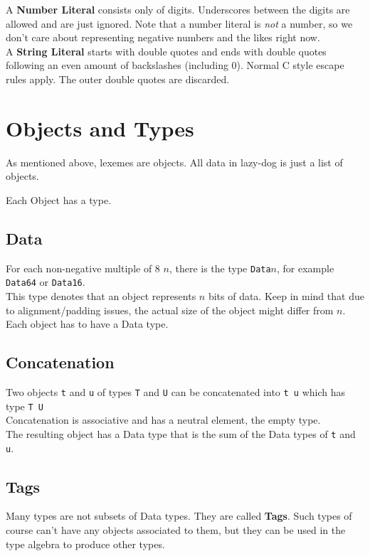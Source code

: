 \documentclass{article}
\begin{document}
A \textbf{Number Literal} consists only of digits.
Underscores between the digits are allowed
and are just ignored.
Note that a number literal is \emph{not} a number,
so we don't care about representing negative numbers
and the likes right now.\\

A \textbf{String Literal} starts with double quotes
and ends with double quotes following an even amount
of backslashes (including 0). 
Normal C style escape rules apply.
The outer double quotes are discarded.

\section{Objects and Types}
As mentioned above, lexemes are objects.
All data in lazy-dog is just a list of objects.

Each Object has a type.

\subsection{Data}
For each non-negative multiple of 8 $n$, there
is the type \verb.Data.$n$,
for example \verb.Data64. or \verb.Data16..\\

This type denotes that an object represents
$n$ bits of data. Keep in mind that due to 
alignment/padding issues, the actual size of the object
might differ from $n$.\\

Each object has to have a Data type.

\subsection{Concatenation}
Two objects \verb.t. and \verb.u. of types 
\verb.T. and \verb.U. can be concatenated
into \verb.t u. which has type \verb.T U.\\

Concatenation is associative and has a neutral
element, the empty type.\\

The resulting object has a Data type that is the
sum of the Data types of \verb.t. and \verb.u..

\subsection{Tags}
Many types are not subsets of Data types.
They are called \textbf{Tags}.
Such types of course can't have any objects associated
to them, but they can be used in the type algebra
to produce other types.\\
\end{document}
